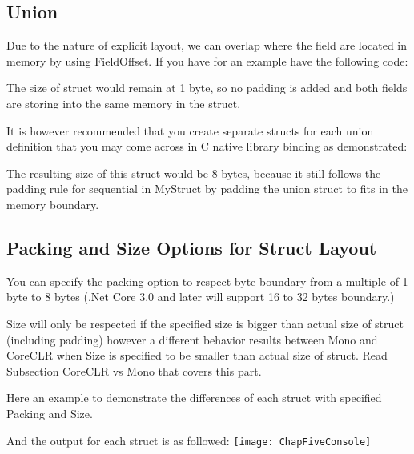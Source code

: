\subsection{Union}
Due to the nature of explicit layout, we can overlap where the field are located in memory by using FieldOffset. If you have for an example have the following code:



The size of struct would remain at 1 byte, so no padding is added and both fields are storing into the same memory in the struct.

It is however recommended that you create separate structs for each union definition that you may come across in C native library binding as demonstrated:



The resulting size of this struct would be 8 bytes, because it still follows the padding rule for sequential in MyStruct by padding the union struct to fits in the memory boundary.

\subsection{Packing and Size Options for Struct Layout}
You can specify the packing option to respect byte boundary from a multiple of 1 byte to 8 bytes (.Net Core 3.0 and later will support 16 to 32 bytes boundary.)

Size will only be respected if the specified size is bigger than actual size of struct (including padding) however a different behavior results between Mono and CoreCLR when Size is specified to be smaller than actual size of struct. Read Subsection CoreCLR vs Mono that covers this part.

Here an example to demonstrate the differences of each struct with specified Packing and Size.


\newpage
And the output for each struct is as followed:
\newline \newline
\texttt{[image: ChapFiveConsole]}

